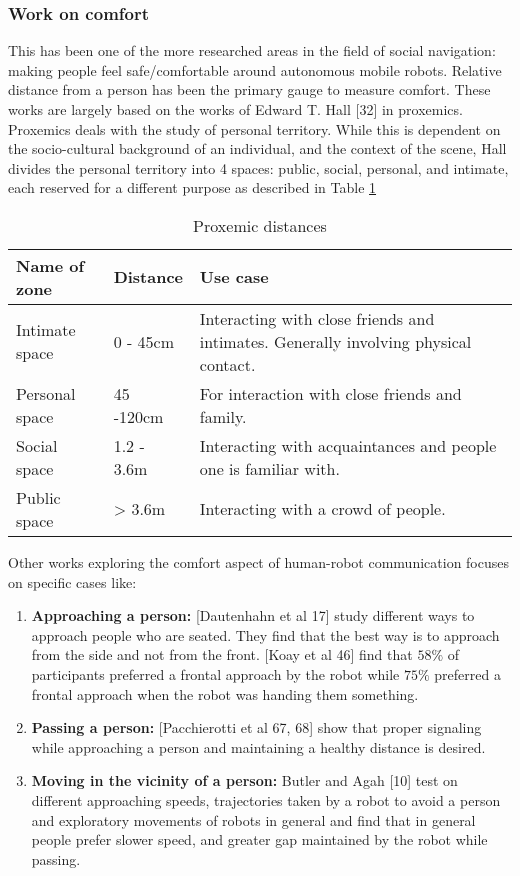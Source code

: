 \subsubsection{Work on comfort}
This has been one of the more researched areas in the field of social navigation: making people feel safe/comfortable around autonomous mobile robots. Relative distance from a person has been the primary gauge to measure comfort. These works are largely based on the works of Edward T. Hall [32] in proxemics. Proxemics deals with the study of personal territory. While this is dependent on the socio-cultural background of an individual, and the context of the scene, Hall divides the personal territory into 4 spaces: public, social, personal, and intimate, each reserved for a different purpose as described in Table \ref{tab:proxemics}
\begin{table}
    \label{tab:proxemics}
    \caption{Proxemic distances}
    \begin{center}
        \renewcommand{\arraystretch}{1.3}
        \begin{tabular}{|p{}|p{}|p{}|}
            \hline
            Name of zone & Distance & Use case \\
            \hline\hline
            Intimate space & 0 - 45cm &  Interacting with close friends and intimates. Generally involving physical contact.\\
            Personal space & 45 -120cm &  For interaction with close friends and family. \\
            Social space & 1.2 - 3.6m &  Interacting with acquaintances and people one is familiar with.\\
            Public space & > 3.6m &  Interacting with a crowd of people.\\
            \hline
        \end{tabular}
    \end{center}
\end{table}
Other works exploring the comfort aspect of human-robot communication focuses on specific cases like:
\begin{enumerate}
    \item \textbf{Approaching a person:} [Dautenhahn et al 17] study different ways to approach people who are seated. They find that the best way is to approach from the side and not from the front.
    [Koay et al 46]  find that $58\%$ of participants preferred a frontal approach by the robot while $75\%$ preferred a frontal approach when the robot was handing them something.
    \item \textbf{Passing a person:} [Pacchierotti et al 67, 68] show that proper signaling while approaching a person and maintaining a healthy distance is desired.
    \item \textbf{Moving in the vicinity of a person:}  Butler and Agah [10] test on different approaching speeds, trajectories taken by a robot to avoid a person and exploratory movements of robots in general and find that in general people prefer slower speed, and greater gap maintained by the robot while passing.
\end{enumerate}

